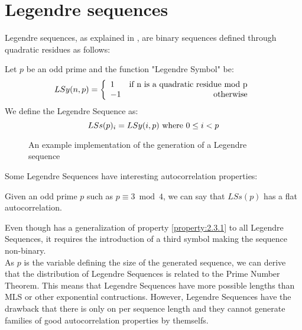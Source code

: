 \section{Legendre sequences}

Legendre sequences, as explained in \citet{legendre_sequences}, are binary
sequences defined through quadratic residues as follows:

\begin{definition}
  Let $p$ be an odd prime and the function "Legendre Symbol" be:
    \begin{equation}
      LSy(n, p) = \left\{\begin{array}{lr}
          1  & \textnormal{if n is a quadratic residue mod p}   \\
          -1 & \textnormal{otherwise} \\
      \end{array}\right.
    \end{equation}
  We define the Legendre Sequence as:
    \begin{equation}
      LSs(p)_{i} = LSy(i, p) \textnormal{  where  } 0 \leq i < p
    \end{equation}
\end{definition}

\begin{figure}[ht!]
  \caption{An example implementation of the generation of a Legendre sequence}
  \label{}
\end{figure}

Some Legendre Sequences have interesting autocorrelation properties:
\begin{property}\label{property:2.3.1}
  Given an odd prime $p$ such as $p \equiv 3 \bmod 4$, we can say that
  $LSs(p)$ has a flat autocorrelation.\cite{legendre_sequences}
\end{property}

Even though \citet{legendre_sequences} has a generalization of property
\ref{property:2.3.1} to all Legendre Sequences, it requires the introduction of
a third symbol making the sequence non-binary. \\

As $p$ is the variable defining the size of the generated sequence, we can
derive that the distribution of Legendre Sequences is related to the Prime
Number Theorem. This means that Legendre Sequences have more possible lengths
than MLS or other exponential contructions. However, Legendre Sequences have
the drawback that there is only on per sequence length and they cannot generate
families of good autocorrelation properties by themselfs.
